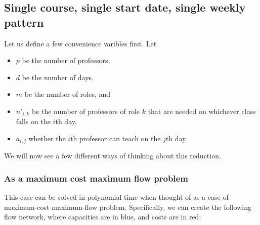 \subsection{Single course, single start date, single weekly pattern}
Let us define a few convenience varibles first. Let
\begin{itemize}
\item $p$ be the number of professors,
\item $d$ be the number of days,
\item $m$ be the number of roles, and
\item $n'_{i, k}$ be the number of professors of role $k$ that are needed on whichever class falls on the $i$th day,
\item $a_{i, j}$ whether the $i$th professor can teach on the $j$th day
\end{itemize}

We will now see a few different ways of thinking about this reduction.
\subsubsection{As a maximum cost maximum flow problem}

This case can be solved in polynomial time when thought of as a case of maximum-cost maximum-flow problem. Specifically, we can create the following flow network, where capacities are in blue, and costs are in red:

